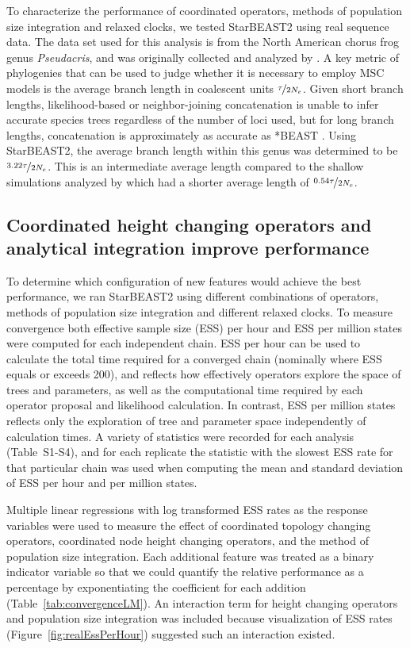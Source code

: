 \documentclass[nogrid]{MBE}%
\begin{document}
To characterize the performance of coordinated operators, methods of population size
integration and relaxed clocks, we tested StarBEAST2 using real sequence data.
The data set used for this analysis is from the North American chorus frog genus
\textit{Pseudacris}, and was originally collected and analyzed by
\cite{Barrow201478}. A key metric of phylogenies that can be used to judge
whether it is necessary to employ MSC models is the average
branch length in coalescent units $\nicefrac{\tau}{2N_e}$. Given short branch
lengths, likelihood-based or neighbor-joining concatenation is unable to infer accurate species trees regardless of
the number of loci used, but for long branch lengths, concatenation is
approximately as accurate as *BEAST \citep{Ogilvie01052016}. Using StarBEAST2,
the average branch length within this genus was determined to be
$\nicefrac{3.22\tau}{2N_e}$. This is an intermediate average length compared to
the shallow simulations analyzed by \cite{Ogilvie01052016} which had a shorter
average length of $\nicefrac{0.54\tau}{2N_e}$.

\subsection{Coordinated height changing operators and analytical integration improve performance}

To determine which configuration of new features would achieve the best
performance, we ran StarBEAST2 using different combinations of operators,
methods of population size integration and different relaxed clocks. To measure
convergence both effective sample size (ESS) per hour and ESS per million states
were computed for each independent chain. ESS per hour can be used to calculate
the total time required for a converged chain (nominally where ESS equals or
exceeds 200), and reflects how effectively operators explore the space of trees
and parameters, as well as the computational time required by each operator
proposal and likelihood calculation. In contrast, ESS per million states
reflects only the exploration of tree and parameter space independently of
calculation times. A variety of statistics were recorded for each analysis
(Table~S1-S4), and for each replicate the statistic with the slowest ESS rate
for that particular chain was used when computing the mean and standard
deviation of ESS per hour and per million states.

Multiple linear regressions with log transformed ESS rates as the response
variables were used to measure the effect of coordinated topology changing operators,
coordinated node height changing operators, and the method of population size
integration. Each additional feature was treated as a binary indicator variable
so that we could quantify the relative performance as a percentage by
exponentiating the coefficient for each addition
(Table~\ref{tab:convergenceLM}). An interaction term for height changing
operators and population size integration was included because visualization of
ESS rates (Figure~\ref{fig:realEssPerHour}) suggested such an interaction existed.
\end{document}

